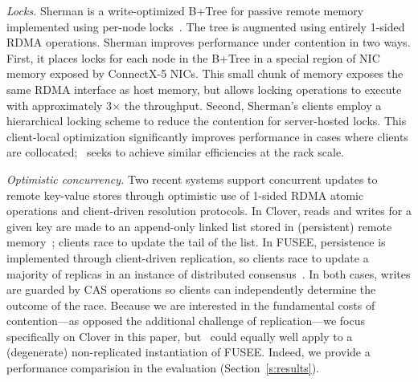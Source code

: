 \emph{Locks.}  Sherman is a write-optimized B+Tree for passive remote
memory implemented using per-node locks~\cite{sherman}. The tree is
augmented using entirely 1-sided RDMA operations. Sherman improves
performance under contention in two ways. First, it places locks for
each node in the B+Tree in a special region of NIC memory exposed by
ConnectX-5 NICs.  This small chunk of memory exposes the same RDMA
interface as host memory, but allows locking operations to execute
with approximately 3$\times$ the throughput.  Second, Sherman's
clients employ a hierarchical locking scheme to reduce the contention
for server-hosted locks.  This client-local optimization significantly
improves performance in cases where clients are collocated;
\sword\ seeks to achieve similar efficiencies at the rack scale.







\emph{Optimistic concurrency.}  Two recent systems support concurrent
updates to remote key-value stores through optimistic use of
1-sided RDMA atomic operations and client-driven resolution protocols. 
In Clover, reads and writes for a given key are made to an append-only
linked list stored in (persistent) remote memory~\cite{clover};
clients race to update the tail of the list.  In FUSEE, persistence is
implemented through client-driven replication, so clients race to
update a majority of replicas in an instance of distributed
consensus~\cite{fusee}.  In both cases, writes are guarded by CAS
operations so clients can independently determine the outcome of the
race.  Because we are interested in the fundamental costs of
  contention---as opposed the additional challenge of replication---we focus specifically on Clover in this paper, but \sword\ could equally well apply to a (degenerate) non-replicated instantiation of FUSEE.  Indeed, we provide a performance comparision in the evaluation (Section~\ref{s:results}).

